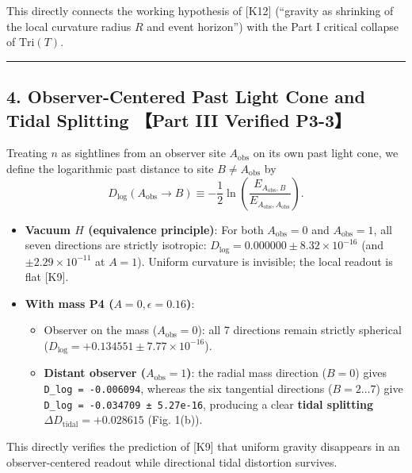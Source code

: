 \documentclass[
  a4paper,
]{article}
\providecommand{\tightlist}{%
  \setlength{\itemsep}{0pt}\setlength{\parskip}{0pt}}
\begin{document}
This directly connects the working hypothesis of {[}K12{]} (``gravity as
shrinking of the local curvature radius \(R\) and event horizon'') with
the Part I critical collapse of \(\mathrm{Tri}(T)\).

\begin{center}\rule{0.5\linewidth}{0.5pt}\end{center}

\subsection{4. Observer-Centered Past Light Cone and Tidal Splitting
【Part III Verified
P3-3】}\label{observer-centered-past-light-cone-and-tidal-splitting-part-iii-verified-p3-3}

Treating \(n\) as sightlines from an observer site \(A_{\mathrm{obs}}\)
on its own past light cone, we define the logarithmic past distance to
site \(B \neq A_{\mathrm{obs}}\) by
\[D_{\log}(A_{\mathrm{obs}} \to B) \equiv -\frac{1}{2}\ln\!\left(\frac{E_{A_{\mathrm{obs}}, B}}{E_{A_{\mathrm{obs}}, A_{\mathrm{obs}}}}\right). \tag{3}\]

\begin{itemize}
\tightlist
\item
  \textbf{Vacuum \(H\) (equivalence principle)}: For both
  \(A_{\mathrm{obs}}=0\) and \(A_{\mathrm{obs}}=1\), all seven
  directions are strictly isotropic:
  \(D_{\log} = 0.000000 \pm 8.32\times 10^{-16}\) (and
  \(\pm 2.29\times 10^{-11}\) at \(A=1\)). Uniform curvature is
  invisible; the local readout is flat {[}K9{]}.
\item
  \textbf{With mass P4 (\(A=0, \epsilon=0.16\))}:

  \begin{itemize}
  \tightlist
  \item
    Observer on the mass (\(A_{\mathrm{obs}}=0\)): all 7 directions
    remain strictly spherical
    (\(D_{\log} = +0.134551 \pm 7.77\times 10^{-16}\)).
  \item
    \textbf{Distant observer (\(A_{\mathrm{obs}}=1\))}: the radial mass
    direction (\(B=0\)) gives \texttt{D\_log\ =\ -0.006094}, whereas the
    six tangential directions (\(B=2\dots 7\)) give
    \texttt{D\_log\ =\ -0.034709\ ±\ 5.27e-16}, producing a clear
    \textbf{tidal splitting \(\Delta D_{\mathrm{tidal}} = +0.028615\)}
    (Fig. 1(b)).
  \end{itemize}
\end{itemize}

This directly verifies the prediction of {[}K9{]} that uniform gravity
disappears in an observer-centered readout while directional tidal
distortion survives.
\end{document}
